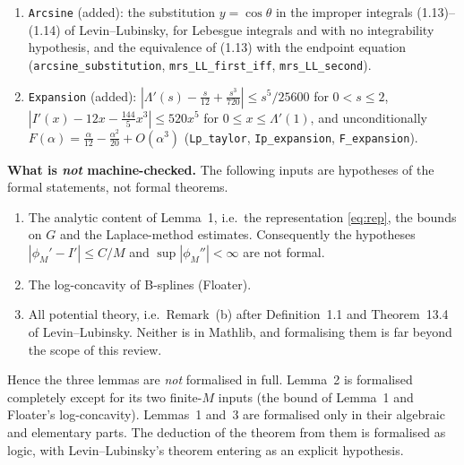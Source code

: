 \documentclass[11pt,a4paper]{article}
\theoremstyle{remark}
\numberwithin{equation}{section}
\begin{document}
\begin{enumerate}
property of the limit proved; only the bound $|\phi_M'-I'|\le C/M$ (Lemma~1) and the regularity of
$\phi_M'$ (Floater) remain hypotheses (\texttt{Hint\_unbounded}, \texttt{endpoint\_concrete}).
\item \texttt{Arcsine} (added): the substitution $y=\cos\theta$ in the improper integrals (1.13)--(1.14)
of Levin--Lubinsky, for Lebesgue integrals and with no integrability hypothesis, and the equivalence of
(1.13) with the endpoint equation (\texttt{arcsine\_substitution}, \texttt{mrs\_LL\_first\_iff},
\texttt{mrs\_LL\_second}).
\item \texttt{Expansion} (added): $|\Lambda'(s)-\frac s{12}+\frac{s^3}{720}|\le s^5/25600$ for $0<s\le2$,
$|I'(x)-12x-\frac{144}5x^3|\le520x^5$ for $0\le x\le\Lambda'(1)$, and unconditionally
$F(\alpha)=\frac\alpha{12}-\frac{\alpha^2}{20}+O(\alpha^3)$ (\texttt{Lp\_taylor}, \texttt{Ip\_expansion},
\texttt{F\_expansion}).
\end{enumerate}

\textbf{What is \emph{not} machine-checked.} The following inputs are hypotheses of the
formal statements, not formal theorems.
\begin{enumerate}
\item The analytic content of Lemma~1, i.e.\ the representation \eqref{eq:rep}, the bounds on
$G$ and the Laplace-method estimates. Consequently the hypotheses
$|\phi_M'-I'|\le C/M$ and $\sup|\phi_M''|<\infty$ are not formal.
\item The log-concavity of B-splines (Floater).
\item All potential theory, i.e.\ Remark~(b) after Definition~1.1 and Theorem~13.4 of
Levin--Lubinsky. Neither is in Mathlib, and formalising them is far beyond the scope of
this review.
\end{enumerate}
Hence the three lemmas are \emph{not} formalised in full. Lemma~2 is formalised completely
except for its two finite-$M$ inputs (the bound of Lemma~1 and Floater's log-concavity). Lemmas~1 and~3 are formalised only in their algebraic and
elementary parts. The deduction of the theorem from them is formalised as logic, with
Levin--Lubinsky's theorem entering as an explicit hypothesis.
\end{document}
